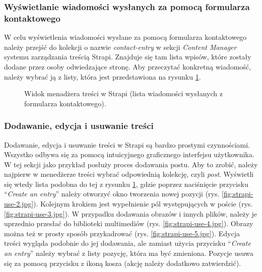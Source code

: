 \documentclass[a4paper, 12pt]{article}
\numberwithin{figure}{section}
\begin{document}
\begin{sloppypar}
\subsubsection*{Wyświetlanie wiadomości wysłanych za pomocą formularza kontaktowego}

W celu wyświetlenia wiadomości wysłane za pomocą formularza kontaktowego należy przejść do kolekcji o nazwie \textit{contact-entry} w sekcji \textit{Content Manager} systemu zarządzania treścią Strapi. Znajduje się tam lista wpisów, które zostały dodane przez osoby odwiedzające stronę. Aby przeczytać konkretną wiadomość, należy wybrać ją z listy, która jest przedstawiona na rysunku \ref{fig:strapi-use-1.jpg}. 

\begin{figure}[H] 
    \centering
   \caption{Widok menadżera treści w Strapi (lista wiadomości wysłanych z formularza kontaktowego).}
   \label{fig:strapi-use-1.jpg}
\end{figure}

\subsubsection*{Dodawanie, edycja i usuwanie treści}

Dodawanie, edycja i usuwanie treści w Strapi są bardzo prostymi czynnościami. Wszystko odbywa się za pomocą intuicyjnego graficznego interfejsu użytkownika. W tej sekcji jako przykład posłuży proces dodawania postu. Aby to zrobić, należy najpierw w menedżerze treści wybrać odpowiednią kolekcję, czyli \textit{post}. Wyświetli się wtedy lista podobna do tej z rysunku \ref{fig:strapi-use-1.jpg}, gdzie poprzez naciśnięcie przycisku ``\textit{Create an entry}'' należy otworzyć okno tworzenia nowej pozycji (rys. \ref{fig:strapi-use-2.jpg}). Kolejnym krokiem jest wypełnienie pól występujących w poście (rys. \ref{fig:strapi-use-3.jpg}). W przypadku dodawania obrazów i innych plików, należy je uprzednio przesłać do biblioteki multimediów (rys. \ref{fig:strapi-use-4.jpg}). Obrazy można też w prosty sposób przykadrować (rys. \ref{fig:strapi-use-5.jpg}). Edycja treści wygląda podobnie do jej dodawania, ale zamiast użycia przycisku ``\textit{Create an entry}'' należy wybrać z listy pozycję, która ma być zmieniona. Pozycje usuwa się za pomocą przycisku z ikoną kosza (akcję należy dodatkowo zatwierdzić). 


\end{sloppypar}
\end{document}
